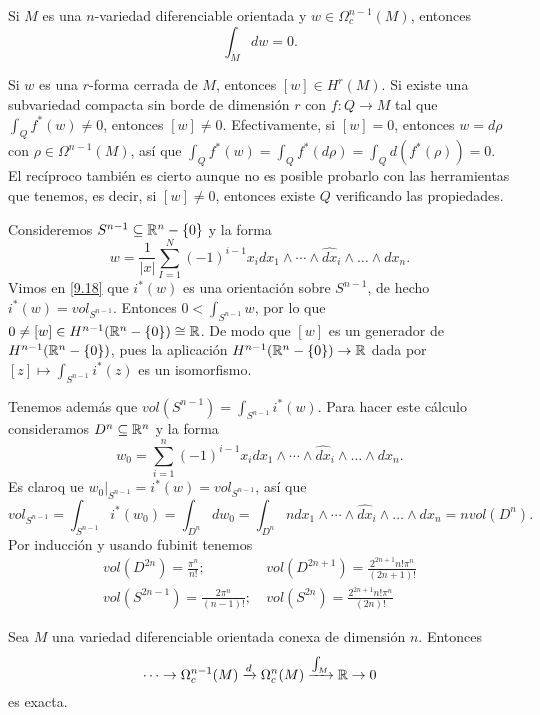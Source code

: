\documentclass[CV.tex]{subfiles}
\begin{document}
\begin{coro}
Si $M$ es una $n$-variedad diferenciable orientada y $w\in \Omega_c^{n-1}(M)$, entonces
\[
\int_M dw=0.
\]
\end{coro}

\begin{nota}
Si $w$ es una $r$-forma cerrada de $M$, entonces $[w]\in H^r(M)$. Si existe una subvariedad compacta sin borde de dimensión $r$ con $f:Q\to M$ tal que $\int_Q f^*(w)\neq 0$, entonces $[w]\neq 0$. Efectivamente, si $[w]=0$, entonces $w=d\rho$ con $\rho\in \Omega^{n-1}(M)$, así que $\int_Q f^*(w)=\int_Q f^*(d\rho)=\int_Q d(f^*(\rho))=0$. El recíproco también es cierto aunque no es posible probarlo con las herramientas que tenemos, es decir, si $[w]\neq 0$, entonces existe $Q$ verificando las propiedades.
\end{nota}

\begin{ej}
Consideremos $S^{n-1}\subseteq\mathbb{R}^n-\{0\}$ y la forma 
\[
w=\frac{1}{|x|}\sum_{I=1}^N(-1)^{i-1}x_i dx_1\land\cdots\land \hat{dx}_i\land\dots\land dx_n.
\]
Vimos en \ref{9.18} que $i^*(w)$ es una orientación sobre $S^{n-1}$, de hecho $i^*(w)=vol_{S^{n-1}}$. Entonces $0<\int_{S^{n-1}} w$, por lo que $0\neq [w]\in H^{n-1}(\mathbb{R}^n-\{0\})\cong\mathbb{R}$. De modo que $[w]$ es un generador de $H^{n-1}(\mathbb{R}^n-\{0\})$, pues la aplicación $H^{n-1}(\mathbb{R}^n-\{0\})\to\mathbb{R}$ dada por $[z]\mapsto \int_{S^{n-1}}i^*(z)$ es un isomorfismo. 

Tenemos además que $vol(S^{n-1})=\int_{S^{n-1}} i^*(w)$. Para hacer este cálculo consideramos $D^n\subseteq\mathbb{R}^n$ y la forma $$w_0=\sum_{i=1}^n (-1)^{i-1} x_idx_1\land\cdots\land \hat{dx}_i\land\dots\land dx_n.$$
Es claroq ue $w_0|_{S^{n-1}}=i^*(w)=vol_{S^{n-1}}$, así que
\[
vol_{S^{n-1}}=\int_{S^{n-1}} i^*(w_0)=\int_{D^n} dw_0=\int_{D^n} n dx_1\land\cdots\land \hat{dx}_i\land\dots\land dx_n=nvol(D^n).
\]
Por inducción y usando fubinit tenemos 
\begin{align*}
vol(D^{2n})=\frac{\pi^n}{n!};\ & vol(D^{2n+1})=\frac{2^{2n+1}n!\pi^n}{(2n+1)!}\\
vol(S^{2n-1})=\frac{2\pi^n}{(n-1)!};\ & vol(S^{2n})=\frac{2^{2n+1}n!\pi^n}{(2n)!}
\end{align*}
\end{ej}

\begin{teorema}\label{aumento}
Sea $M$ una variedad diferenciable orientada conexa de dimensión $n$. Entonces
\[
\cdots\to\Omega_c^{n-1}(M)\xrightarrow{d}\Omega_c^{n}(M)\xrightarrow{\int_M}\mathbb{R}\to 0
\]
es exacta.
\end{teorema}
\end{document}
